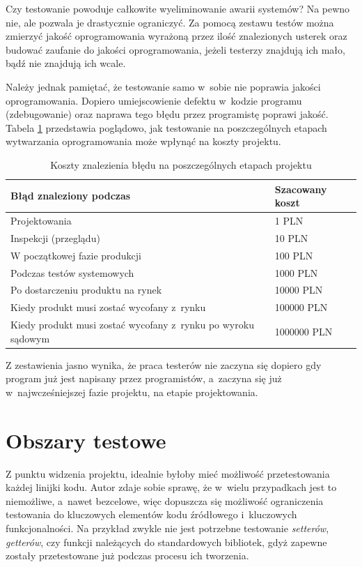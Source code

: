 Czy testowanie powoduje całkowite wyeliminowanie awarii systemów? Na pewno nie, ale pozwala je drastycznie ograniczyć. Za pomocą zestawu testów można zmierzyć jakość oprogramowania wyrażoną przez ilość znalezionych usterek oraz budować zaufanie do jakości oprogramowania, jeżeli testerzy znajdują ich mało, bądź nie znajdują ich wcale.

Należy jednak pamiętać, że testowanie samo w~sobie nie poprawia jakości oprogramowania. Dopiero umiejscowienie defektu w~kodzie programu (zdebugowanie) oraz naprawa tego błędu przez programistę poprawi jakość. Tabela \ref{tab:koszty_bledu} przedstawia poglądowo, jak testowanie na poszczególnych etapach wytwarzania oprogramowania może wpłynąć na koszty projektu.

\begin{table}[]
\centering
\caption{Koszty znalezienia błędu na poszczególnych etapach projektu}
\label{tab:koszty_bledu}
\begin{tabular}{|l|l|}
\hline
\textbf{Błąd znaleziony podczas} & \textbf{Szacowany koszt} \\ \hline
Projektowania & 1 PLN	\\ \hline
Inspekcji (przeglądu) & 10 PLN	\\ \hline
W początkowej fazie produkcji & 100 PLN	\\ \hline
Podczas testów systemowych & 1000 PLN	\\ \hline
Po dostarczeniu produktu na rynek & 10000 PLN	\\ \hline
Kiedy produkt musi zostać wycofany z~rynku & 100000 PLN	\\ \hline
Kiedy produkt musi zostać wycofany z~rynku po wyroku sądowym & 1000000 PLN	\\ \hline
\end{tabular}
\end{table}

Z zestawienia jasno wynika, że praca testerów nie zaczyna się dopiero gdy program już jest napisany przez programistów, a~zaczyna się już w~najwcześniejszej fazie projektu, na etapie projektowania.

\section{Obszary testowe}
Z punktu widzenia projektu, idealnie byłoby mieć możliwość przetestowania każdej linijki kodu. Autor zdaje sobie sprawę, że w~wielu przypadkach jest to niemożliwe, a~nawet bezcelowe, więc dopuszcza się możliwość ograniczenia testowania do kluczowych elementów kodu źródłowego i~kluczowych funkcjonalności. Na przykład zwykle nie jest potrzebne testowanie \textit{setterów}, \textit{getterów}, czy funkcji należących do standardowych bibliotek, gdyż zapewne zostały przetestowane już podczas procesu ich tworzenia. 

